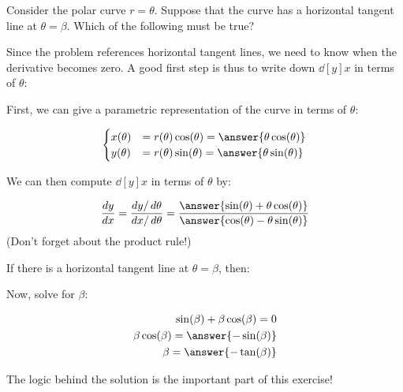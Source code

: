 \documentclass{ximera}
\author{Jim Talamo}
\begin{document}
\begin{exercise}
Consider the polar curve $r = \theta$.  Suppose that the curve has a horizontal tangent line at $\theta = \beta$.  Which of the following must be true?

\begin{multipleChoice}
\choice{$\beta = \cos{\beta}$}
\choice{$\beta = -\cos{\beta}$}
\choice{$\beta = \sin{\beta}$}
\choice{$\beta = -\sin{\beta}$}
\choice{$\beta = \tan{\beta}$}
\choice[correct]{$\beta = -\tan{\beta}$}
\choice{$\beta = \cot{\beta}$}
\choice{$\beta = -\cot{\beta}$}
\end{multipleChoice}

\begin{hint}
Since the problem references horizontal tangent lines, we need to know when the derivative becomes zero.  A good first step is thus to write down $\dd[y]{x}$ in terms of $\theta$:

First, we can give a parametric representation of the curve in terms of $\theta$:

\[
\begin{cases}
x(\theta) &= r(\theta) \cos(\theta) = \answer{\theta \cos(\theta)}\\
y(\theta) &= r(\theta) \sin(\theta) = \answer{\theta \sin(\theta)}
\end{cases}
\]

We can then compute $\dd[y]{x}$ in terms of $\theta$ by:

\[
\dd[y]{x} = \frac{dy / \d \theta}{dx / \d \theta} = \frac{ \answer{\sin(\theta) + \theta \cos(\theta)} }{ \answer{\cos(\theta) - \theta \sin(\theta)} }
\]
(Don't forget about the product rule!)

\begin{question}
If there is a horizontal tangent line at $\theta = \beta$, then:

\begin{multipleChoice}
\end{multipleChoice}
\end{question}

Now, solve for $\beta$:

\begin{align*}
\sin(\beta) + \beta \cos(\beta)=0 \\
 \beta \cos(\beta)=\answer{-\sin(\beta)}\\
\beta = \answer{-\tan(\beta)}
\end{align*}
\end{hint}

The logic behind the solution is the important part of this exercise!

\end{exercise}
\end{document}
